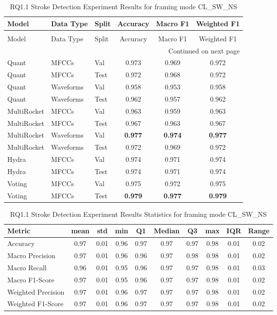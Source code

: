 \begin{longtable}{|l|l|l|c|c|c|}
\caption{RQ1.1 Stroke Detection Experiment Results for framing mode CL\_SW\_NS} \label{tab:rq1.1_Stroke_Detection_Results} \\
\toprule
Model & Data Type & Split & Accuracy & Macro F1 & Weighted F1 \\
\midrule
\endfirsthead
\caption[]{RQ1.1 Stroke Detection Experiment Results for framing mode CL\_SW\_NS} \\
\toprule
Model & Data Type & Split & Accuracy & Macro F1 & Weighted F1 \\
\midrule
\endhead
\midrule
\multicolumn{6}{r}{Continued on next page} \\
\midrule
\endfoot
\bottomrule
\endlastfoot
Quant & MFCCs & Val & 0.973 & 0.969 & 0.972 \\
Quant & MFCCs & Test & 0.972 & 0.968 & 0.972 \\
Quant & Waveforms & Val & 0.958 & 0.953 & 0.958 \\
Quant & Waveforms & Test & 0.962 & 0.957 & 0.962 \\
MultiRocket & MFCCs & Val & 0.963 & 0.959 & 0.963 \\
MultiRocket & MFCCs & Test & 0.967 & 0.963 & 0.967 \\
MultiRocket & Waveforms & Val & \textbf{0.977} & \textbf{0.974} & \textbf{0.977} \\
MultiRocket & Waveforms & Test & 0.972 & 0.969 & 0.972 \\
Hydra & MFCCs & Val & 0.974 & 0.971 & 0.974 \\
Hydra & MFCCs & Test & 0.974 & 0.971 & 0.974 \\
Voting & MFCCs & Val & 0.975 & 0.972 & 0.975 \\
Voting & MFCCs & Test & \textbf{0.979} & \textbf{0.977} & \textbf{0.979} \\
\end{longtable}

\begin{table}[h]
\caption{RQ1.1 Stroke Detection Experiment Results Statistics for framing mode CL\_SW\_NS}
\label{tab:rq1.1_Stroke_Detection_Results_Statistics}
\begin{tabular}{|l|c|c|c|c|c|c|c|c|c|}
\toprule
Metric & mean & std & min & Q1 & Median & Q3 & max & IQR & Range \\
\midrule
Accuracy & 0.97 & 0.01 & 0.96 & 0.97 & 0.97 & 0.97 & 0.98 & 0.01 & 0.02 \\
Macro Precision & 0.97 & 0.01 & 0.96 & 0.96 & 0.97 & 0.98 & 0.98 & 0.01 & 0.02 \\
Macro Recall & 0.96 & 0.01 & 0.95 & 0.96 & 0.97 & 0.97 & 0.98 & 0.01 & 0.03 \\
Macro F1-Score & 0.97 & 0.01 & 0.95 & 0.96 & 0.97 & 0.97 & 0.98 & 0.01 & 0.02 \\
Weighted Precision & 0.97 & 0.01 & 0.96 & 0.97 & 0.97 & 0.97 & 0.98 & 0.01 & 0.02 \\
Weighted F1-Score & 0.97 & 0.01 & 0.96 & 0.97 & 0.97 & 0.97 & 0.98 & 0.01 & 0.02 \\
\bottomrule
\end{tabular}
\end{table}
